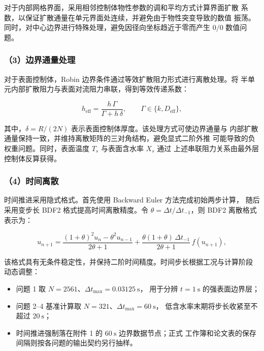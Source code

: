 \documentclass[withoutpreface,bwprint]{cumcmthesis}
\begin{document}
对于内部网格界面，采用相邻控制体物性参数的调和平均方式计算界面扩散
系数，以保证扩散通量在单元界面处连续，并避免由于物性突变导致的数值
振荡。同时，对中心边界进行特殊处理，避免因径向坐标趋近于零而产生
$0/0$ 数值问题。

\subsubsection*{（3）边界通量处理}

对于表面控制体，Robin 边界条件通过等效扩散阻力形式进行离散处理。将
半单元内部扩散阻力与表面对流阻力串联，得到等效传递系数：

\begin{equation}
  h_{\mathrm{eff}}=\frac{h\,\Gamma}{\Gamma+h\,\delta},\qquad
  \Gamma\in\{k,D_{\mathrm{eff}}\},
  \label{eq:heff}
\end{equation}

其中，$\delta=R/(2N)$ 表示表面控制体厚度。该处理方式可使边界通量与
内部扩散通量保持一致，并维持离散矩阵的三对角结构，避免显式二阶外推
可能导致的负权重问题。同时，表面温度 $T_s$ 与表面含水率 $X_s$ 通过
上述串联阻力关系由最外层控制体反算获得。

\subsubsection*{（4）时间离散}

时间推进采用隐式格式。首先使用 Backward Euler 方法完成初始两步计算，
随后采用变步长 BDF2 格式提高时间离散精度\cite{gear1971}。令
$\theta=\Delta t/\Delta t_{-1}$，则 BDF2 离散格式表示为：

\begin{equation}
  u_{n+1}=\frac{(1+\theta)^2u_n-\theta^2u_{n-1}}{2\theta+1}
  +\frac{\theta(1+\theta)\,\Delta t_{-1}}{2\theta+1}\,f(u_{n+1}),
  \label{eq:bdf2}
\end{equation}

该格式具有无条件稳定性，并保持二阶时间精度。时间步长根据工况与计算阶段
动态调整：

\begin{itemize}
  \item 问题 1 取 $N=2561$、$\Delta t_{\max}=0.03125\ \mathrm{s}$，
  用于分辨 $t=1\ \mathrm{s}$ 的强表面边界层；
  \item 问题 2--4 基准计算取 $N=321$、$\Delta t_{\max}=60\ \mathrm{s}$，
  低含水率末期将步长收紧至不超过 $20\ \mathrm{s}$；
  \item 时间推进强制落在附件 1 的 $60\ \mathrm{s}$ 边界数据节点；正式
  工作簿和论文表的保存间隔则按各问题的输出契约另行抽样。
\end{itemize}
\end{document}
